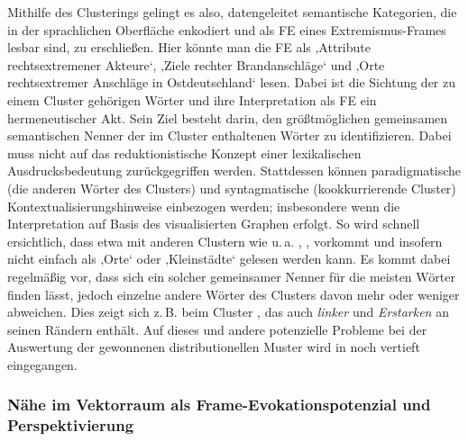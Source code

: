 Mithilfe des Clusterings gelingt es also, datengeleitet semantische Kategorien, die in der sprachlichen Oberfläche enkodiert und als FE eines Extremismus-Frames lesbar sind, zu erschließen. Hier könnte man die FE als ‚Attribute rechtsextremener Akteure`, ‚Ziele rechter Brandanschläge` und ‚Orte rechtsextremer Anschläge in Ostdeutschland` lesen. Dabei ist die Sichtung der zu einem Cluster gehörigen Wörter und ihre Interpretation als FE ein hermeneutischer Akt. Sein Ziel besteht darin, den größtmöglichen gemeinsamen semantischen Nenner der im Cluster enthaltenen Wörter zu identifizieren. Dabei muss nicht auf das reduktionistische Konzept einer lexikalischen Ausdrucksbedeutung zurückgegriffen werden. Stattdessen können paradigmatische (die anderen Wörter des Clusters) und syntagmatische (kookkurrierende Cluster) Kontextualisierungshinweise einbezogen werden; insbesondere wenn die Interpretation auf Basis des visualisierten Graphen erfolgt. So wird schnell ersichtlich, dass etwa  mit anderen Clustern wie u.\,a. , ,  vorkommt und insofern nicht einfach als ‚Orte` oder ‚Kleinstädte` gelesen werden kann. Es kommt dabei regelmäßig vor, dass sich ein solcher gemeinsamer Nenner für die meisten Wörter finden lässt, jedoch einzelne andere Wörter des Clusters davon mehr oder weniger abweichen. Dies zeigt sich z.\,B. beim Cluster , das auch \emph{linker} und \emph{Erstarken} an seinen Rändern enthält. Auf dieses und andere potenzielle Probleme bei der Auswertung der gewonnenen distributionellen Muster wird in  noch vertieft eingegangen.

\subsubsection{Nähe im Vektorraum als Frame-Evokationspotenzial und Perspektivierung}\label{naehe-im-vektorraum-als-frame-evokationspotenzial-und-perspektivierung}


